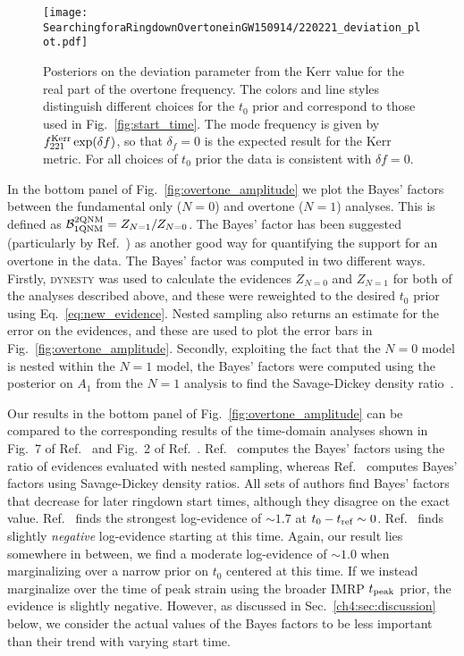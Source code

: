 \begin{figure}[t]
	\texttt{[image: SearchingforaRingdownOvertoneinGW150914/220221\_deviation\_plot.pdf]}
	\caption[Posteriors on the deviation from the Kerr for the real part of the GW150914 overtone frequency]{ 
		Posteriors on the deviation parameter from the Kerr value for the real part of the overtone frequency.
		The colors and line styles distinguish different choices for the $t_0$ prior and correspond to those used in Fig.~\ref{fig:start_time}.
		The mode frequency is given by $f_{221}^{\rm Kerr} \exp(\delta f)$, so that $\delta_f=0$ is the expected result for the Kerr metric.
		For all choices of $t_0$ prior the data is consistent with $\delta f=0$.
	}
	\label{fig:delta_f}
\end{figure}

In the bottom panel of Fig.~\ref{fig:overtone_amplitude} we plot the Bayes' factors between the fundamental only ($N=0$) and overtone ($N=1$) analyses.
This is defined as $\mathcal{B}_{\rm 1QNM}^{\rm 2QNM}=Z_{N=1}/Z_{N=0}$.
The Bayes' factor has been suggested (particularly by Ref.~\cite{Cotesta:2022pci}) as another good way for quantifying the support for an overtone in the data.
The Bayes' factor was computed in two different ways.
Firstly, \textsc{dynesty} was used to calculate the evidences $Z_{N=0}$ and $Z_{N=1}$ for both of the analyses described above, and these were reweighted to the desired $t_0$ prior using Eq.~\ref{eq:new_evidence}. 
Nested sampling also returns an estimate for the error on the evidences, and these are used to plot the error bars in Fig.~\ref{fig:overtone_amplitude}.
Secondly, exploiting the fact that the $N=0$ model is nested within the $N=1$ model, the Bayes' factors were computed using the posterior on $A_1$ from the $N=1$ analysis to find the Savage-Dickey density ratio~\cite{10.2307/2958475}. 

Our results in the bottom panel of Fig.~\ref{fig:overtone_amplitude} can be compared to the corresponding results of the time-domain analyses shown in Fig.~7 of Ref.~\cite{Isi:2022mhy} and Fig.~2 of Ref.~\cite{Cotesta:2022pci}.
Ref.~\cite{Cotesta:2022pci} computes the Bayes' factors using the ratio of evidences evaluated with nested sampling, whereas Ref.~\cite{Isi:2022mhy} computes Bayes' factors using Savage-Dickey density ratios.
All sets of authors find Bayes' factors that decrease for later ringdown start times, although they disagree on the exact value.
Ref.~\cite{Isi:2022mhy} finds the strongest log-evidence of $\sim 1.7$ at $t_0-t_{\rm ref} \sim 0$.
Ref.~\cite{Cotesta:2022pci} finds slightly \emph{negative} log-evidence starting at this time.
Again, our result lies somewhere in between, we find a moderate log-evidence of $\sim 1.0$ when marginalizing over a narrow prior on $t_0$ centered at this time.
If we instead marginalize over the time of peak strain using the broader IMRP $t_{\rm peak}$ prior, the evidence is slightly negative.
However, as discussed in Sec.~\ref{ch4:sec:discussion} below, we consider the actual values of the Bayes factors to be less important than their trend with varying start time.

